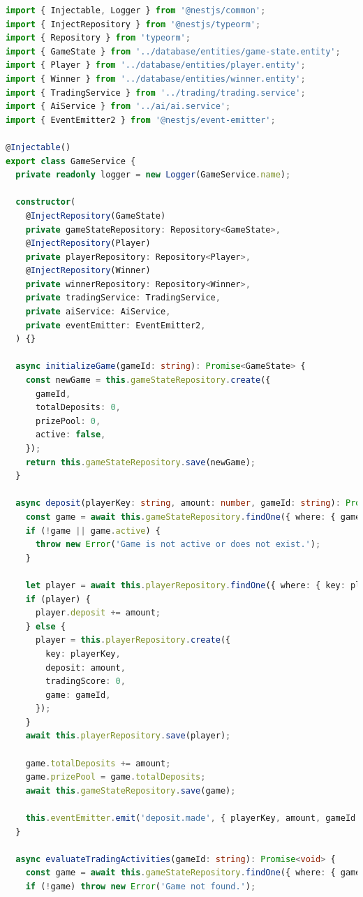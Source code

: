 \documentclass[11pt,a4paper]{article}
\begin{document}
\begin{lstlisting}[language=TypeScript, caption={Game Service}]
import { Injectable, Logger } from '@nestjs/common';
import { InjectRepository } from '@nestjs/typeorm';
import { Repository } from 'typeorm';
import { GameState } from '../database/entities/game-state.entity';
import { Player } from '../database/entities/player.entity';
import { Winner } from '../database/entities/winner.entity';
import { TradingService } from '../trading/trading.service';
import { AiService } from '../ai/ai.service';
import { EventEmitter2 } from '@nestjs/event-emitter';

@Injectable()
export class GameService {
  private readonly logger = new Logger(GameService.name);

  constructor(
    @InjectRepository(GameState)
    private gameStateRepository: Repository<GameState>,
    @InjectRepository(Player)
    private playerRepository: Repository<Player>,
    @InjectRepository(Winner)
    private winnerRepository: Repository<Winner>,
    private tradingService: TradingService,
    private aiService: AiService,
    private eventEmitter: EventEmitter2,
  ) {}

  async initializeGame(gameId: string): Promise<GameState> {
    const newGame = this.gameStateRepository.create({
      gameId,
      totalDeposits: 0,
      prizePool: 0,
      active: false,
    });
    return this.gameStateRepository.save(newGame);
  }

  async deposit(playerKey: string, amount: number, gameId: string): Promise<void> {
    const game = await this.gameStateRepository.findOne({ where: { gameId } });
    if (!game || game.active) {
      throw new Error('Game is not active or does not exist.');
    }

    let player = await this.playerRepository.findOne({ where: { key: playerKey, game: gameId } });
    if (player) {
      player.deposit += amount;
    } else {
      player = this.playerRepository.create({
        key: playerKey,
        deposit: amount,
        tradingScore: 0,
        game: gameId,
      });
    }
    await this.playerRepository.save(player);

    game.totalDeposits += amount;
    game.prizePool = game.totalDeposits;
    await this.gameStateRepository.save(game);

    this.eventEmitter.emit('deposit.made', { playerKey, amount, gameId });
  }

  async evaluateTradingActivities(gameId: string): Promise<void> {
    const game = await this.gameStateRepository.findOne({ where: { gameId }, relations: ['players'] });
    if (!game) throw new Error('Game not found.');


\end{lstlisting}
\end{document}
